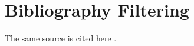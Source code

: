 \documentclass[a4paper,12pt]{report}
\begin{document}
\chapter{Bibliography Filtering}
\nocite{referenced_source}
The same source is cited here \cite{referenced_source}.
\bibliographyChapter
\end{document}
